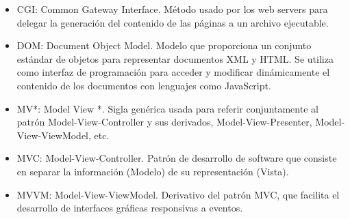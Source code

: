 \documentclass[doc,helv,longtable]{article}
\begin{document}
\begin{itemize}
\item  CGI: Common Gateway Interface. Método usado por los web servers para delegar la generación del contenido de las páginas a un archivo ejecutable.
\item  DOM: Document Object Model. Modelo que proporciona un conjunto estándar de objetos para representar documentos XML y HTML. Se utiliza como interfaz de programación para acceder y modificar dinámicamente el contenido de los documentos con lenguajes como JavaScript.
\item  MV*: Model View *. Sigla genérica usada para referir conjuntamente al patrón Model-View-Controller y sus derivados, Model-View-Presenter, Model-View-ViewModel, etc.
\item  MVC: Model-View-Controller. Patrón de desarrollo de software que consiste en separar la información (Modelo) de su representación (Vista).
\item  MVVM: Model-View-ViewModel. Derivativo del patrón MVC, que facilita el desarrollo de interfaces gráficas responsivas a eventos.

\end{itemize}
\end{document}
